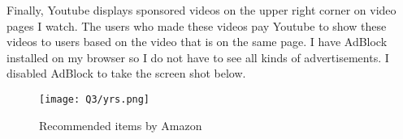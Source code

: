 \pagebreak

Finally, Youtube displays sponsored videos on the upper right corner on  video pages I watch. The users who made these videos pay Youtube to show these videos to users based on the video that is on the same page. I have AdBlock installed on my browser so I do not have to see all kinds of advertisements. I disabled AdBlock to take the screen shot below.

\begin{figure}[h]
\caption{Recommended items by Amazon}
\centering
\texttt{[image: Q3/yrs.png]}
\end{figure}
 

 

